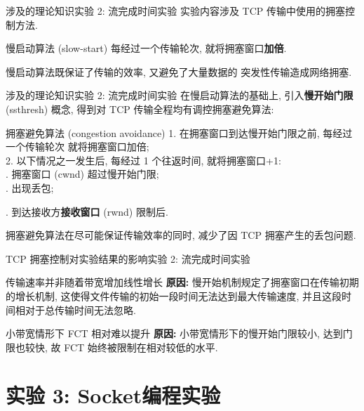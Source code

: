 \documentclass{beamer}
\begin{document}
\begin{frame}{涉及的理论知识}{实验 2: 流完成时间实验}
    实验内容涉及 TCP 传输中使用的拥塞控制方法.
    \newline\newline
    \begin{block}{慢启动算法 (slow-start)}
        每经过一个传输轮次, 就将拥塞窗口\textbf{加倍}.
    \end{block}

    慢启动算法既保证了传输的效率, 又避免了大量数据的
    突发性传输造成网络拥塞.
\end{frame}
\begin{frame}{涉及的理论知识}{实验 2: 流完成时间实验}
    在慢启动算法的基础上, 引入\textbf{慢开始门限} (ssthresh)
    概念, 得到对 TCP 传输全程均有调控拥塞避免算法:

    \begin{block}{拥塞避免算法 (congestion avoidance)}
        1. 在拥塞窗口到达慢开始门限之前, 每经过一个传输轮次
        就将拥塞窗口加倍;\\
        2. 以下情况之一发生后, 每经过 1 个往返时间,
        就将拥塞窗口+1:\\
        . 拥塞窗口 (cwnd) 超过慢开始门限;\\
        . 出现丢包;

        . 到达接收方\textbf{接收窗口} (rwnd) 限制后.
    \end{block}

    拥塞避免算法在尽可能保证传输效率的同时, 减少了因 TCP 拥塞产生的丢包问题.
\end{frame}
\begin{frame}{TCP 拥塞控制对实验结果的影响}{实验 2: 流完成时间实验}
    \begin{block}{传输速率并非随着带宽增加线性增长}
        \textbf{原因:}
        慢开始机制规定了拥塞窗口在传输初期的增长机制,
        这使得文件传输的初始一段时间无法达到最大传输速度,
        并且这段时间相对于总传输时间无法忽略.
    \end{block}
    \begin{block}{小带宽情形下 FCT 相对难以提升}
        \textbf{原因:}
        小带宽情形下的慢开始门限较小, 达到门限也较快,
        故 FCT 始终被限制在相对较低的水平.
    \end{block}
\end{frame}
\section{实验 3: Socket编程实验}
\begin{frame}
    \sectionpage
\end{frame}
\end{document}
